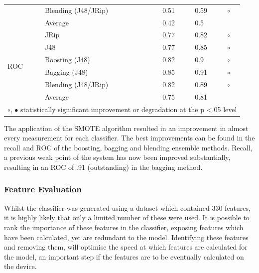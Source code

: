 \begin{table}[ph]
\begin{tabular}{@{}lllll@{}}
                           & Blending (J48/JRip) & 0.51  & 0.59                                                    & $\circ$ \\
                           & Average             & 0.42  & 0.5                                                     &         \\ \midrule
\multirow{6}{*}{ROC}       & JRip                & 0.77  & 0.82                                                    & $\circ$ \\
                           & J48                 & 0.77  & 0.85                                                    & $\circ$ \\
                           & Boosting (J48)      & 0.82  & 0.9                                                     & $\circ$ \\
                           & Bagging  (J48)      & 0.85  & 0.91                                                    & $\circ$ \\
                           & Blending (J48/JRip) & 0.82  & 0.89                                                    & $\circ$ \\
                           & Average             & 0.75  & 0.81                                                    &         \\ \midrule
\multicolumn{5}{c}{$\circ$, $\bullet$ statistically significant improvement or degradation at the p \textless .05 level} \\ \bottomrule
\end{tabular}
\end{table}

The application of the SMOTE algorithm resulted in an improvement in almost every measurement for each classifier. The best improvements can be found in the recall and ROC of the boosting, bagging and blending ensemble methods. Recall, a previous weak point of the system has now been improved substantially, resulting in an ROC of .91 (outstanding) in the bagging method.

\subsubsection{Feature Evaluation}
Whilst the classifier was generated using a dataset which contained 330 features, it is highly likely that only a limited number of these were used. It is possible to rank the importance of these features in the classifier, exposing features which have been calculated, yet are redundant to the model. Identifying these features and removing them, will optimise the speed at which features are calculated for the model, an important step if the features are to be eventually calculated on the device.

